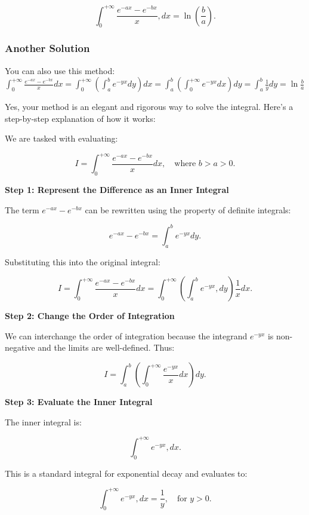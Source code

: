 \documentclass[a4paper,12pt]{book}
\begin{document}
\[
\int_0^{+\infty} \frac{e^{-ax} - e^{-bx}}{x} , dx = \ln\left(\frac{b}{a}\right).
\]


\subsubsection{Another Solution}

\begin{bluebox}
You can also use this method:  \(  \int_0^{+\infty} \frac{e^{-ax}-e^{-bx}}{x} dx = \int_0^{+\infty} \left(\int_a^b e^{-yx} dy \right) dx = \int_a^b \left( \int_0^{+\infty} e^{-yx} dx \right) dy = \int_a^b \frac{1}{y} dy = \ln{\frac{b}{a}} \)
\end{bluebox}

Yes, your method is an elegant and rigorous way to solve the integral. Here's a step-by-step explanation of how it works:

We are tasked with evaluating:

\[
I = \int_0^{+\infty} \frac{e^{-ax} - e^{-bx}}{x} dx, \quad \text{where } b > a > 0.
\]

\textbf{Step 1: Represent the Difference as an Inner Integral}

The term \( e^{-ax} - e^{-bx} \) can be rewritten using the property of definite integrals:

\[
e^{-ax} - e^{-bx} = \int_a^b e^{-yx} dy.
\]

Substituting this into the original integral:

\[
I = \int_0^{+\infty} \frac{e^{-ax} - e^{-bx}}{x} dx = \int_0^{+\infty} \left( \int_a^b e^{-yx} , dy \right) \frac{1}{x} dx.
\]

\hrulefill

\textbf{Step 2: Change the Order of Integration}

We can interchange the order of integration because the integrand \( e^{-yx} \) is non-negative and the limits are well-defined. Thus:

\[
I = \int_a^b \left( \int_0^{+\infty} \frac{e^{-yx}}{x} dx \right) dy.
\]

\hrulefill

\textbf{Step 3: Evaluate the Inner Integral}

The inner integral is:

\[
\int_0^{+\infty} e^{-yx} , dx.
\]

This is a standard integral for exponential decay and evaluates to:

\[
\int_0^{+\infty} e^{-yx} , dx = \frac{1}{y}, \quad \text{for } y > 0.
\]
\end{document}
